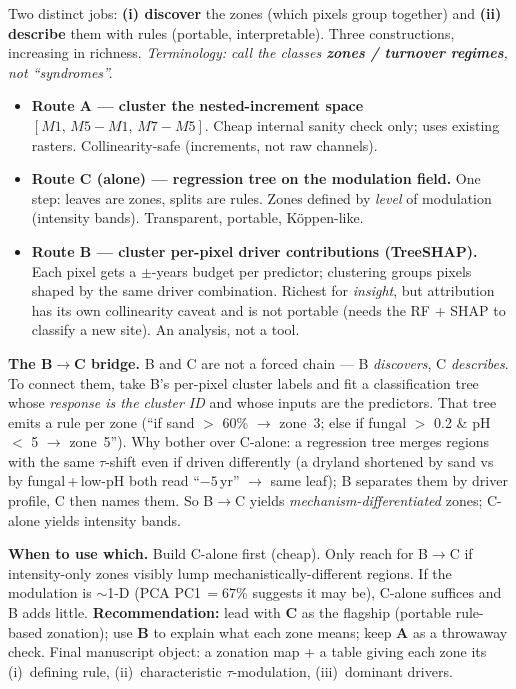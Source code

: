 \documentclass[11pt,a4paper]{article}
\begin{document}
Two distinct jobs: \textbf{(i) discover} the zones (which pixels group together)
and \textbf{(ii) describe} them with rules (portable, interpretable). Three
constructions, increasing in richness. \emph{Terminology: call the classes
\textbf{zones / turnover regimes}, not ``syndromes''.}

\begin{itemize}[nosep]
  \item \textbf{Route A --- cluster the nested-increment space}
  $[M1,\,M5\!-\!M1,\,M7\!-\!M5]$. Cheap internal sanity check only; uses
  existing rasters. Collinearity-safe (increments, not raw channels).
  \item \textbf{Route C (alone) --- regression tree on the modulation field.}
  One step: leaves are zones, splits are rules. Zones defined by \emph{level} of
  modulation (intensity bands). Transparent, portable, Köppen-like.
  \item \textbf{Route B --- cluster per-pixel driver contributions (TreeSHAP).}
  Each pixel gets a $\pm$-years budget per predictor; clustering groups pixels
  shaped by the same driver combination. Richest for \emph{insight}, but
  attribution has its own collinearity caveat and is not portable (needs the RF
  + SHAP to classify a new site). An analysis, not a tool.
\end{itemize}

\noindent\textbf{The B$\to$C bridge.} B and C are not a forced chain --- B
\emph{discovers}, C \emph{describes}. To connect them, take B's per-pixel
cluster labels and fit a classification tree whose \emph{response is the cluster
ID} and whose inputs are the predictors. That tree emits a rule per zone (``if
sand $>$ 60\% $\to$ zone~3; else if fungal $>$ 0.2 \& pH $<$ 5 $\to$
zone~5''). Why bother over C-alone: a regression tree merges regions with the
same $\tau$-shift even if driven differently (a dryland shortened by sand vs by
fungal\,+\,low-pH both read ``$-5$\,yr'' $\to$ same leaf); B separates them by
driver profile, C then names them. So B$\to$C yields
\emph{mechanism-differentiated} zones; C-alone yields intensity bands.

\noindent\textbf{When to use which.} Build C-alone first (cheap). Only reach for
B$\to$C if intensity-only zones visibly lump mechanistically-different regions.
If the modulation is $\sim$1-D (PCA PC1\,$=67\%$ suggests it may be), C-alone
suffices and B adds little. \textbf{Recommendation:} lead with \textbf{C} as the
flagship (portable rule-based zonation); use \textbf{B} to explain what each
zone means; keep \textbf{A} as a throwaway check. Final manuscript object: a
zonation map + a table giving each zone its (i)~defining rule,
(ii)~characteristic $\tau$-modulation, (iii)~dominant drivers.
\end{document}
